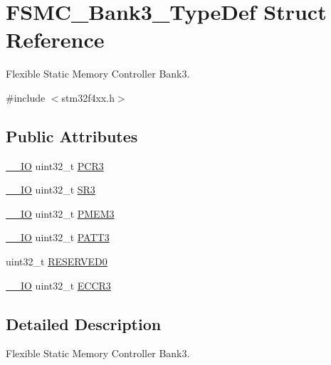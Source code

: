 \hypertarget{struct_f_s_m_c___bank3___type_def}{}\section{F\+S\+M\+C\+\_\+\+Bank3\+\_\+\+Type\+Def Struct Reference}
\label{struct_f_s_m_c___bank3___type_def}


Flexible Static Memory Controller Bank3.  




{\ttfamily \#include $<$stm32f4xx.\+h$>$}

\subsection*{Public Attributes}
\begin{DoxyCompactItemize}
\item 
\hyperlink{core__cm4_8h_aec43007d9998a0a0e01faede4133d6be}{\+\_\+\+\_\+\+IO} uint32\+\_\+t \hyperlink{struct_f_s_m_c___bank3___type_def_a1f772e1028641cab7b923bf02115b919}{P\+C\+R3}
\item 
\hyperlink{core__cm4_8h_aec43007d9998a0a0e01faede4133d6be}{\+\_\+\+\_\+\+IO} uint32\+\_\+t \hyperlink{struct_f_s_m_c___bank3___type_def_ab89f16f64018a1f1e55d36f92b84be94}{S\+R3}
\item 
\hyperlink{core__cm4_8h_aec43007d9998a0a0e01faede4133d6be}{\+\_\+\+\_\+\+IO} uint32\+\_\+t \hyperlink{struct_f_s_m_c___bank3___type_def_a756258d9266b1eee3455bc850107beb6}{P\+M\+E\+M3}
\item 
\hyperlink{core__cm4_8h_aec43007d9998a0a0e01faede4133d6be}{\+\_\+\+\_\+\+IO} uint32\+\_\+t \hyperlink{struct_f_s_m_c___bank3___type_def_a0cbf1b4647f98914238202828de47416}{P\+A\+T\+T3}
\item 
uint32\+\_\+t \hyperlink{struct_f_s_m_c___bank3___type_def_a2e9cac528ee7bfce11b0b9a36db3b954}{R\+E\+S\+E\+R\+V\+E\+D0}
\item 
\hyperlink{core__cm4_8h_aec43007d9998a0a0e01faede4133d6be}{\+\_\+\+\_\+\+IO} uint32\+\_\+t \hyperlink{struct_f_s_m_c___bank3___type_def_a6935beb5bbc2de668024c1989eecd46c}{E\+C\+C\+R3}
\end{DoxyCompactItemize}


\subsection{Detailed Description}
Flexible Static Memory Controller Bank3. 

